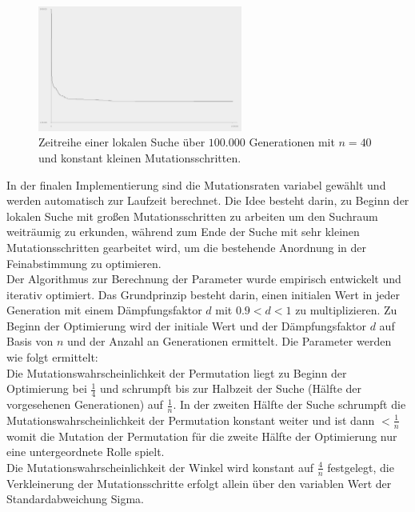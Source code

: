\documentclass[twoside,bibtotoc]{report}
\begin{document}
\begin{figure}[h]
 \centering
 \includegraphics [width=0.6\textwidth]{Bilder/Hillclimb_constsmall.png}
 \caption{
 	Zeitreihe einer lokalen Suche über $100.000$ Generationen mit $n = 40$
 	und konstant kleinen Mutationsschritten.
 	}
 \label{fig:hillclimb_constsmall}
\end{figure}

\nsecend%



In der finalen Implementierung sind die Mutationsraten variabel gewählt und werden automatisch zur Laufzeit berechnet.
Die Idee besteht darin, zu Beginn der lokalen Suche mit großen Mutationsschritten zu arbeiten um den Suchraum weiträumig zu erkunden, während zum Ende der Suche mit sehr kleinen Mutationsschritten gearbeitet wird, um die bestehende Anordnung in der Feinabstimmung zu optimieren.\\

Der Algorithmus zur Berechnung der Parameter wurde empirisch entwickelt und iterativ optimiert.
Das Grundprinzip besteht darin, einen initialen Wert in jeder Generation mit einem Dämpfungsfaktor $d$ mit $0.9 < d < 1$ zu multiplizieren.
Zu Beginn der Optimierung wird der initiale Wert und der Dämpfungsfaktor $d$ auf Basis von $n$ und der Anzahl an Generationen ermittelt.
Die Parameter werden wie folgt ermittelt:\\

Die Mutationswahrscheinlichkeit der Permutation liegt zu Beginn der Optimierung bei $\frac{1}{4}$ und schrumpft bis zur Halbzeit der Suche (Hälfte der vorgesehenen Generationen) auf $\frac{1}{n}$. In der zweiten Hälfte der Suche schrumpft die Mutationswahrscheinlichkeit der Permutation konstant weiter und ist dann $<\frac{1}{n}$ womit die Mutation der Permutation für die zweite Hälfte der Optimierung nur eine untergeordnete Rolle spielt.\\

Die Mutationswahrscheinlichkeit der Winkel wird konstant auf $\frac{4}{n}$ festgelegt, die Verkleinerung der Mutationsschritte erfolgt allein über den variablen Wert der Standardabweichung Sigma.\\
\end{document}
